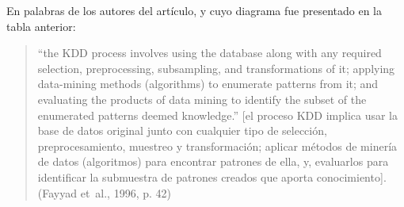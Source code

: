 \documentclass[
  12pt,
  letterpaper,
]{article}
\begin{document}
\begin{table}[!h]
\centering
\caption{\label{tab:tabla-kdd}Proceso de Knowledge Discovery in Databases (KDD)}
\centering
{}
\end{table}

En palabras de los autores del artículo, y cuyo diagrama fue presentado en la tabla anterior:

\begin{quote}
``the KDD process involves using the database along with any required selection, preprocessing, subsampling, and transformations of it; applying data-mining methods (algorithms) to enumerate patterns from it; and evaluating the products of data mining to identify the subset of the enumerated patterns deemed knowledge.'' {[}el proceso KDD implica usar la base de datos original junto con cualquier tipo de selección, preprocesamiento, muestreo y transformación; aplicar métodos de minería de datos (algoritmos) para encontrar patrones de ella, y, evaluarlos para identificar la submuestra de patrones creados que aporta conocimiento{]}.(Fayyad et~al., 1996, p. 42)
\end{quote}
\end{document}
